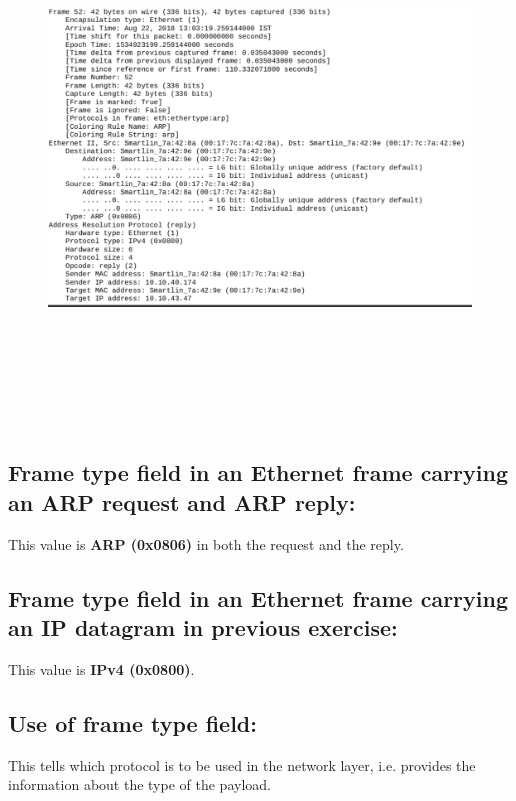 \documentclass[]{report}
\begin{document}
\begin{figure}[H]
	\vspace{0pt}
	\includegraphics[height=400pt, keepaspectratio, center]{Snapshots/exe7/rep.png}
\end{figure}

\subsection{Frame type field in an Ethernet frame carrying an ARP request and ARP reply: }
This value is \textbf{ARP (0x0806)} in both the request and the reply.

\subsection{Frame type field in an Ethernet frame carrying an IP datagram in previous exercise: }
This value is \textbf{IPv4 (0x0800)}.

\subsection{Use of frame type field: }
This tells which protocol is to be used in the network layer, i.e. provides the information about the type of the payload. 
\end{document}
